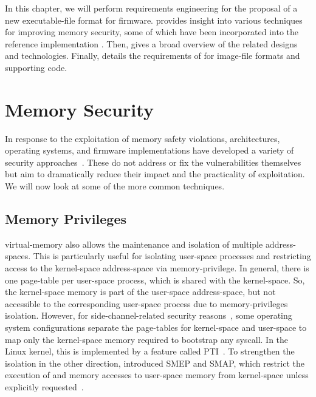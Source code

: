 In this chapter, we will perform requirements engineering for the proposal of a new \gls{executable-file} format for  \gls{firmware}.  provides insight into various techniques for improving memory security, some of which have been incorporated into the  reference implementation . Then,  gives a broad overview of the related  designs and technologies. Finally,  details the requirements of  for \gls{image-file} formats and supporting code.

\section{Memory Security}
\label{sec:mem_sec}

In response to the exploitation of memory safety violations,  architectures, operating systems, and \gls{firmware} implementations have developed a variety of security approaches~\cite{10.1007/978-3-642-33338-5_5}. These do not address or fix the vulnerabilities themselves but aim to dramatically reduce their impact and the practicality of exploitation. We will now look at some of the more common techniques.

\subsection{Memory Privileges}
\label{sec:mem_privileges}

\Gls{virtual-memory} also allows the maintenance and isolation of multiple \glspl{address-space}. This is particularly useful for isolating \gls{user-space} processes and restricting access to the \gls{kernel-space} \gls{address-space} via \gls{memory-privilege}. In general, there is one \gls{page-table} per \gls{user-space} process, which is shared with the \gls{kernel-space}. So, the \gls{kernel-space} memory is part of the \gls{user-space} \gls{address-space}, but not accessible to the corresponding \gls{user-space} process due to \glspl{memory-privilege} isolation. However, for \gls{side-channel}-related security reasons~\cite{meltdown,kaiser}, some operating system configurations separate the \glspl{page-table} for \gls{kernel-space} and \gls{user-space} to map only the \gls{kernel-space} memory required to bootstrap any \gls{syscall}. In the Linux kernel, this is implemented by a feature called \gls{PTI}~\cite{pti}. To strengthen the isolation in the other direction,  introduced \gls{SMEP} and \gls{SMAP}, which restrict the execution of and memory accesses to \gls{user-space} memory from \gls{kernel-space} unless explicitly requested~\cite{ia32}.

